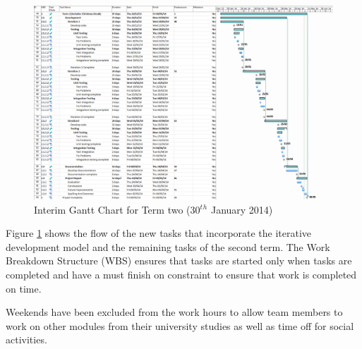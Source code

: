 \begin{landscape}
\begin{figure}[H]
  \centering
  \includegraphics[width=\linewidth]{images/gant_chart_interim_term2.png}
  \caption{Interim Gantt Chart for Term two (30$^t$$^h$ January 2014)}
  \label{fig:ganttinterimterm2}
\end{figure}

\end{landscape}

Figure \ref{fig:ganttinterimterm2} shows the flow of the new tasks that
incorporate the iterative development model and the remaining tasks of the
second term. The Work Breakdown Structure (WBS) ensures that tasks are started
only when tasks are completed and have a must finish on constraint to ensure
that work is completed on time.

Weekends have been excluded from the work hours to allow team members to work on
other modules from their university studies as well as time off for social
activities.

